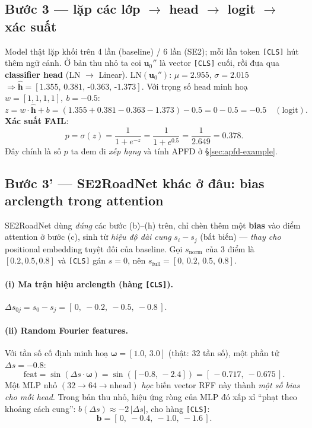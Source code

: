 \documentclass[11pt]{article}
\newcommand{\code}[1]{\textcolor{cInk}{\texttt{#1}}}
\theoremstyle{definition}
\begin{document}
\subsection{Bước 3 --- lặp các lớp $\to$ head $\to$ logit $\to$ xác suất}
\label{sec:trace-head}
Model thật lặp khối trên 4 lần (baseline) / 6 lần (SE2); mỗi lần token
\code{[CLS]} hút thêm ngữ cảnh. Ở bản thu nhỏ ta coi $\mathbf{u}_0''$ là vector
\code{[CLS]} cuối, rồi đưa qua \textbf{classifier head} (LN $\to$ Linear).
LN$(\mathbf{u}_0'')$: $\mu=2.955$, $\sigma=2.015$ $\Rightarrow
\hat{\mathbf{h}}=[1.355,\,0.381,\,\text{-}0.363,\,\text{-}1.373]$.
Với trọng số head minh hoạ $w=[1,1,1,1],\ b=-0.5$:
\[
z=w\cdot\hat{\mathbf{h}}+b=(1.355{+}0.381{-}0.363{-}1.373)-0.5=0-0.5=\boxed{-0.5}
\quad(\text{logit}).
\]
\textbf{Xác suất FAIL}:
\[
p=\sigma(z)=\frac{1}{1+e^{-z}}=\frac{1}{1+e^{0.5}}=\frac{1}{2.649}=\boxed{0.378}.
\]
Đây chính là số $p$ ta đem đi \emph{xếp hạng} và tính APFD ở \S\ref{sec:apfd-example}.

\subsection{Bước 3' --- SE2RoadNet khác ở đâu: bias arclength trong attention}
\label{sec:trace-se2}
SE2RoadNet dùng \emph{đúng} các bước (b)--(h) trên, chỉ chèn thêm một
\textbf{bias} vào điểm attention ở bước (c), sinh từ \emph{hiệu độ dài cung}
$s_i-s_j$ (bất biến) --- \emph{thay cho} positional embedding tuyệt đối của
baseline. Gọi $s_{\text{norm}}$ của 3 điểm là $[0.2,0.5,0.8]$ và \code{[CLS]}
gán $s=0$, nên $s_{\text{full}}=[0,\,0.2,\,0.5,\,0.8]$.

\paragraph{(i) Ma trận hiệu arclength (hàng \code{[CLS]}).}
$\Delta s_{0j}=s_0-s_j=[\,0,\ -0.2,\ -0.5,\ -0.8\,]$.

\paragraph{(ii) Random Fourier features.} Với tần số cố định minh hoạ
$\boldsymbol\omega=[1.0,\,3.0]$ (thật: 32 tần số), một phần tử $\Delta s=-0.8$:
\[
\mathrm{feat}=\sin(\Delta s\cdot\boldsymbol\omega)=\sin([-0.8,\,-2.4])
=[\,-0.717,\ -0.675\,].
\]
Một MLP nhỏ $(32{\to}64{\to}\text{nhead})$ \emph{học} biến vector RFF này thành
\emph{một số bias cho mỗi head}. Trong bản thu nhỏ, hiệu ứng ròng của MLP đó xấp
xỉ ``phạt theo khoảng cách cung'': $b(\Delta s)\approx-2\,|\Delta s|$, cho hàng
\code{[CLS]}:
\[
\mathbf{b}=[\,0,\ -0.4,\ -1.0,\ -1.6\,].
\]
\end{document}
